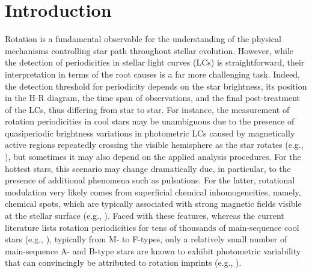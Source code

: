 \documentclass[RNAAS]{aastex63}
\begin{document}

\section{Introduction} \label{sec:intro}

Rotation is a fundamental observable for the understanding of the physical mechanisms controlling star path throughout stellar evolution. However, while the detection of periodicities in stellar light curves (LCs) is straightforward, their interpretation in terms of the root causes is a far more challenging task. Indeed, the detection threshold for periodicity depends on the star brightness, its position in the H-R diagram, the time span of observations, and the final post-treatment of the LCs, thus differing from star to star. For instance, the measurement of rotation periodicities in cool stars may be unambiguous due to the presence of quasiperiodic brightness variations in photometric LCs caused by magnetically active regions repeatedly crossing the visible hemisphere as the star rotates (e.g., \citealp{Irwin2009}), but sometimes it may also depend on the applied analysis procedures. For the hottest stars, this scenario may change dramatically due, in particular, to the presence of additional phenomena such as pulsations. For the latter, rotational modulation very likely comes from superficial chemical inhomogeneities, namely, chemical spots, which are typically associated with strong magnetic fields visible at the stellar surface (e.g., \citealp{Michaud1981,Krticka2009,Krticka2012,Krticka2015}). Faced with these features, whereas the current literature lists rotation periodicities for tens of thousands of main-sequence cool stars (e.g., \citealp{Reinhold2013,McQuillan2014,Canto2020}), typically from M- to F-types, only a relatively small number of main-sequence A- and B-type stars are known to exhibit photometric variability that can convincingly be attributed to rotation imprints (e.g., \citealp{Sikora2020}).
\end{document}
